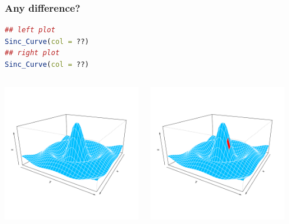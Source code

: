 \documentclass{beamer}
\begin{document}
\begin{frame}[fragile]

\end{frame}



\begin{frame}[fragile]
\frametitle{Any difference?}
\begin{lstlisting}[language = R]
## left plot
Sinc_Curve(col = ??)
## right plot
Sinc_Curve(col = ??)
\end{lstlisting}

\begin{columns}[c]
\includegraphics[height = 6cm, width = 6cm]{plot/persp_diff_1.pdf}

\includegraphics[height = 6cm, width = 6cm]{plot/persp_diff_2.pdf}

\end{columns}
\end{frame}
\end{document}
